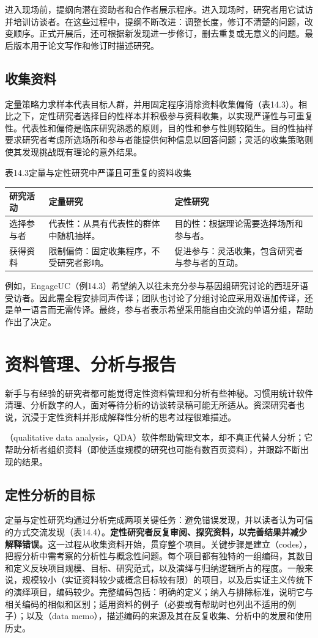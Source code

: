 进入现场前，提纲向潜在资助者和合作者展示程序。进入现场时，研究者用它试访并培训访谈者。在这些过程中，提纲不断改进：调整长度，修订不清楚的问题，改变顺序。正式开展后，还可根据新发现进一步修订，删去重复或无意义的问题。最后版本用于论文写作和修订时描述研究。

\subsection{收集资料}
定量策略力求样本代表目标人群，并用固定程序消除资料收集偏倚（表14.3）。相比之下，定性研究者选择目的性样本并积极参与资料收集，以实现严谨性与可重复性。代表性和偏倚是临床研究熟悉的原则，目的性和参与性则较陌生。目的性抽样要求研究者考虑所选场所和参与者能提供何种信息以回答问题；灵活的收集策略则使其发现挑战既有理论的意外结果。
\begin{bookbox}{表14.3\quad 定量与定性研究中严谨且可重复的资料收集}
\begin{tabularx}{\linewidth}{L{.17\linewidth}YY}\toprule
研究活动 & 定量研究 & 定性研究\\\midrule
选择参与者 & 代表性：从具有代表性的群体中随机抽样。 & 目的性：根据理论需要选择场所和参与者。\\
获得资料 & 限制偏倚：固定收集程序，不受研究者影响。 & 促进参与：灵活收集，包含研究者与参与者的互动。\\\bottomrule
\end{tabularx}
\end{bookbox}
例如，EngageUC（例14.3）希望纳入以往未充分参与基因组研究讨论的西班牙语受访者。因此需全程安排同声传译；团队也讨论了分组讨论应采用双语加传译，还是单一语言而无需传译。最终，参与者表示希望采用能自由交流的单语分组，帮助作出了决定。

\section{资料管理、分析与报告}
新手与有经验的研究者都可能觉得定性资料管理和分析有些神秘。习惯用统计软件清理、分析数字的人，面对等待分析的访谈转录稿可能无所适从。资深研究者也说，沉浸于定性资料并形成解释性分析的思考过程很难描述。

（qualitative data analysis，QDA）软件帮助管理文本，却不真正代替人分析；它帮助分析者组织资料（即使适度规模的研究也可能有数百页资料），并跟踪不断出现的结果。
\subsection{定性分析的目标}
定量与定性研究均通过分析完成两项关键任务：避免错误发现，并以读者认为可信的方式交流发现（表14.4）。\textbf{定性研究者反复审阅、探究资料，以完善结果并减少解释错误。}这一过程从收集资料开始，贯穿整个项目。关键步骤是建立（codes），把握分析中需考察的分析性与概念性问题。每个项目都有独特的一组编码，其数目和定义反映项目规模、目标、研究范式，以及演绎与归纳逻辑所占的程度。一般来说，规模较小（实证资料较少或概念目标较有限）的项目，以及后实证主义传统下的演绎项目，编码较少。完整编码包括：明确的定义；纳入与排除标准，说明它与相关编码的相似和区别；适用资料的例子（必要或有帮助时也列出不适用的例子）；以及（data memo），描述编码的来源及其在反复收集、分析中的发展和使用历史。

